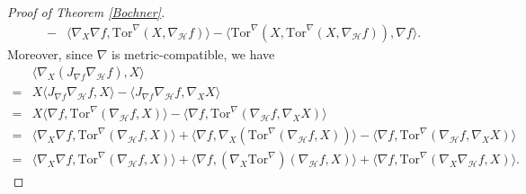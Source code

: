 \documentclass[11pt]{article}
\numberwithin{equation}{section}
\newcommand{\Tor}{\mathrm{Tor}}
\begin{document}
\begin{proof}[Proof of Theorem \ref{Bochner}]
\begin{align*}
			-&\langle \nabla_X\nabla f , \Tor^\nabla(X, \nabla_{\mathcal{H}}f) \rangle-\langle \Tor^\nabla(X, \Tor^{\nabla}(X, \nabla_\mathcal{H}f) ), \nabla f \rangle.
		\end{align*}
		Moreover, since $\nabla$ is metric-compatible, we have
		\begin{align*}
			&\langle \nabla_X (J_{\nabla f}\nabla_\mathcal{H}f), X \rangle\\
			=&X\langle J_{\nabla f}\nabla_\mathcal{H}f, X \rangle-\langle J_{\nabla f}\nabla_\mathcal{H}f, \nabla_X X \rangle  \\
			=&X\langle \nabla f, \Tor^\nabla(\nabla_\mathcal{H}f, X) \rangle-\langle   \nabla f, \Tor^\nabla(\nabla_{\mathcal{H}}f, \nabla_X X)\rangle\\
			=&\langle \nabla_X \nabla f, \Tor^\nabla(\nabla_{\mathcal{H}}f, X) \rangle+\langle \nabla f, \nabla_X (\Tor^\nabla(\nabla_{\mathcal{H}}f, X)) \rangle-\langle \nabla f,  \Tor^\nabla(\nabla_{\mathcal{H}}f, \nabla_X X) \rangle \\
			=&\langle \nabla_X \nabla f, \Tor^\nabla(\nabla_{\mathcal{H}}f, X) \rangle+\langle \nabla f, (\nabla_X \Tor^\nabla)(\nabla_{\mathcal{H}}f, X) \rangle+\langle \nabla f,  \Tor^\nabla(\nabla_X \nabla_{\mathcal{H}}f,  X) \rangle.
		\end{align*}
		

\end{proof}
\end{document}
